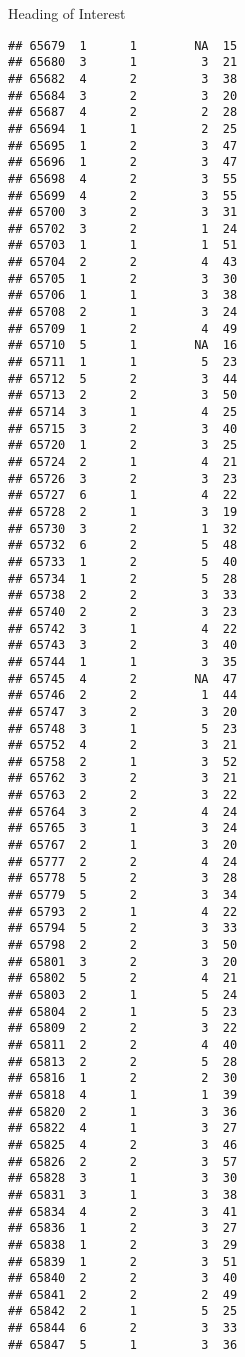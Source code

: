 \documentclass[
  ignorenonframetext,
]{beamer}
\begin{document}
\begin{frame}[fragile]{Heading of Interest}
\begin{verbatim}
## 65679  1      1        NA  15
## 65680  3      1         3  21
## 65682  4      2         3  38
## 65684  3      2         3  20
## 65687  4      2         2  28
## 65694  1      1         2  25
## 65695  1      2         3  47
## 65696  1      2         3  47
## 65698  4      2         3  55
## 65699  4      2         3  55
## 65700  3      2         3  31
## 65702  3      2         1  24
## 65703  1      1         1  51
## 65704  2      2         4  43
## 65705  1      2         3  30
## 65706  1      1         3  38
## 65708  2      1         3  24
## 65709  1      2         4  49
## 65710  5      1        NA  16
## 65711  1      1         5  23
## 65712  5      2         3  44
## 65713  2      2         3  50
## 65714  3      1         4  25
## 65715  3      2         3  40
## 65720  1      2         3  25
## 65724  2      1         4  21
## 65726  3      2         3  23
## 65727  6      1         4  22
## 65728  2      1         3  19
## 65730  3      2         1  32
## 65732  6      2         5  48
## 65733  1      2         5  40
## 65734  1      2         5  28
## 65738  2      2         3  33
## 65740  2      2         3  23
## 65742  3      1         4  22
## 65743  3      2         3  40
## 65744  1      1         3  35
## 65745  4      2        NA  47
## 65746  2      2         1  44
## 65747  3      2         3  20
## 65748  3      1         5  23
## 65752  4      2         3  21
## 65758  2      1         3  52
## 65762  3      2         3  21
## 65763  2      2         3  22
## 65764  3      2         4  24
## 65765  3      1         3  24
## 65767  2      1         3  20
## 65777  2      2         4  24
## 65778  5      2         3  28
## 65779  5      2         3  34
## 65793  2      1         4  22
## 65794  5      2         3  33
## 65798  2      2         3  50
## 65801  3      2         3  20
## 65802  5      2         4  21
## 65803  2      1         5  24
## 65804  2      1         5  23
## 65809  2      2         3  22
## 65811  2      2         4  40
## 65813  2      2         5  28
## 65816  1      2         2  30
## 65818  4      1         1  39
## 65820  2      1         3  36
## 65822  4      1         3  27
## 65825  4      2         3  46
## 65826  2      2         3  57
## 65828  3      1         3  30
## 65831  3      1         3  38
## 65834  4      2         3  41
## 65836  1      2         3  27
## 65838  1      2         3  29
## 65839  1      2         3  51
## 65840  2      2         3  40
## 65841  2      2         2  49
## 65842  2      1         5  25
## 65844  6      2         3  33
## 65847  5      1         3  36

\end{verbatim}
\end{frame}
\end{document}
